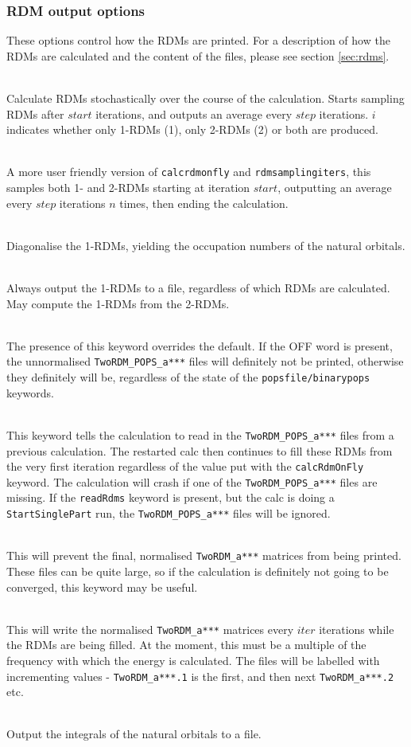 \documentclass[a4paper,notitlepage]{scrreprt}
\newcommand\codeitem[1]{\needspace{1.5\baselineskip}\item[\textnormal{\ttfamily #1 \nopagebreak}] \hfill \\ \nopagebreak}
\let\code\lstinline
\begin{document}
    \subsubsection{RDM output options}
    These options control how the RDMs are printed. For a description of how
    the RDMs are calculated and the content of the files, please see section \ref{sec:rdms}.
    \begin{description}
      \codeitem{calcRdmOnfly $i$ $step$ $start$}
      Calculate RDMs stochastically over the course of the calculation. Starts
      sampling RDMs after $start$ iterations, and outputs an average every $step$
      iterations. $i$ indicates whether only 1-RDMs (1), only 2-RDMs (2) or
      both are produced.
      \codeitem{rdmLinSpace $start$ $n$ $step$}
      A more user friendly version of \texttt{calcrdmonfly} and \texttt{rdmsamplingiters}, this samples both
      1- and 2-RDMs starting at iteration $start$, outputting an average every
      $step$ iterations $n$ times, then ending the calculation.
      \codeitem{diagFlyOneRdm}
      Diagonalise the 1-RDMs, yielding the occupation numbers of the natural
      orbitals.
      \codeitem{printOneRdm}
      Always output the 1-RDMs to a file, regardless of which RDMs are
      calculated. May compute the 1-RDMs from the 2-RDMs.
      \codeitem{writeRdmsToRead off}
      The presence of this keyword overrides the default.  If the OFF word is present, the unnormalised \code{TwoRDM_POPS_a***}
    files will definitely not be printed, otherwise they definitely will be, regardless of the state of the
    \code{popsfile/binarypops} keywords.

    \codeitem{readRdms}
    This keyword tells the calculation to read in the \code{TwoRDM_POPS_a***} files from a previous calculation.  The
    restarted calc then continues to fill these RDMs from the very first iteration regardless of the value put with
    the \code{calcRdmOnFly} keyword.  The calculation will crash if one of the \code{TwoRDM_POPS_a***} files are missing.  If
    the \code{readRdms} keyword is present, but the calc is doing a \code{StartSinglePart} run, the \code{TwoRDM_POPS_a***} files
    will be ignored.

    \codeitem{noNormRdms}
    This will prevent the final, normalised \code{TwoRDM_a***} matrices from being printed.  These files can be quite
    large, so if the calculation is definitely not going to be converged, this keyword may be useful.

    \codeitem{writeRdmsEvery $iter$}
    This will write the normalised \code{TwoRDM_a***} matrices every $iter$ iterations while the RDMs are being
    filled.  At the moment, this must be a multiple of the frequency with which the energy is calculated.  The
    files will be labelled with incrementing values - \code{TwoRDM_a***.1} is the first, and then next \code{TwoRDM_a***.2} etc.      
      \codeitem{printRoDump}
      Output the integrals of the natural orbitals to a file.
    \end{description}
\end{document}

